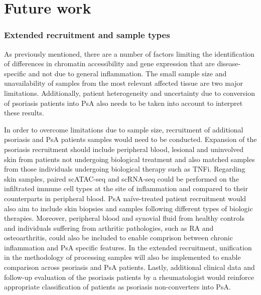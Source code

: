 


\section{Future work}
\subsubsection{Extended recruitment and sample types}

As previously mentioned, there are a number of factors limiting the identification of differences in chromatin accessibility and gene expression that are disease-specific and not due to general inflammation. The small sample size and unavailability of samples from the most relevant affected tissue are two major limitations. Additionally, patient heterogeneity and uncertainty due to conversion of psoriasis patients into PsA also needs to be taken into account to interpret these results.

In order to overcome limitations due to sample size, recruitment of additional psoriasis and PsA patients samples would need to be conducted. Expansion of the psoriasis recruitment should include peripheral blood, lesional and uninvolved skin from patients not undergoing biological treatment and also matched samples from those individuals undergoing biological therapy such as TNFi. Regarding skin samples, paired scATAC-seq and scRNA-seq could be performed on the infiltrated immune cell types at the site of inflammation and compared to their counterparts in peripheral blood. PsA na\'{i}ve-treated patient recruitment would also aim to include skin biopsies and samples following different types of biologic therapies. Moreover, peripheral blood and synovial fluid from healthy controls and individuals suffering from arthritic pathologies, such as RA and osteoarthritis, could also be included to enable comprison between chronic inflammation and PsA specific features. In the extended recruitment, unification in the methodology of processing samples will also be implemented to enable comparison across psoriasis and PsA patients. Lastly, additional clinical data and follow-up evaluation of the psoriasis patients by a rheumatologist would reinforce appropriate classification of patients as psoriasis non-converters into PsA.

